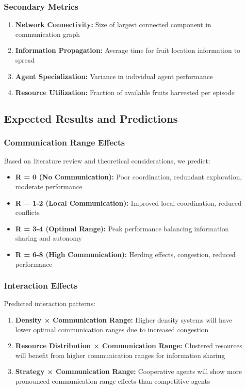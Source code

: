 \documentclass[12pt,a4paper]{article}
\begin{document}
\subsubsection{Secondary Metrics}

\begin{enumerate}
    \item \textbf{Network Connectivity:} Size of largest connected component in communication graph
    \item \textbf{Information Propagation:} Average time for fruit location information to spread
    \item \textbf{Agent Specialization:} Variance in individual agent performance
    \item \textbf{Resource Utilization:} Fraction of available fruits harvested per episode
\end{enumerate}

\subsection{Expected Results and Predictions}

\subsubsection{Communication Range Effects}

Based on literature review and theoretical considerations, we predict:

\begin{itemize}
    \item \textbf{R = 0 (No Communication):} Poor coordination, redundant exploration, moderate performance
    \item \textbf{R = 1-2 (Local Communication):} Improved local coordination, reduced conflicts
    \item \textbf{R = 3-4 (Optimal Range):} Peak performance balancing information sharing and autonomy
    \item \textbf{R = 6-8 (High Communication):} Herding effects, congestion, reduced performance
\end{itemize}

\subsubsection{Interaction Effects}

Predicted interaction patterns:

\begin{enumerate}
    \item \textbf{Density × Communication Range:} Higher density systems will have lower optimal communication ranges due to increased congestion

    \item \textbf{Resource Distribution × Communication Range:} Clustered resources will benefit from higher communication ranges for information sharing

    \item \textbf{Strategy × Communication Range:} Cooperative agents will show more pronounced communication range effects than competitive agents
\end{enumerate}
\end{document}
